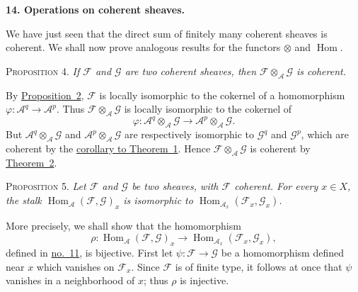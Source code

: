 
\medskip
{}\label{fac:I:2:no:14}
\textbf{14. Operations on coherent sheaves.}

We have just seen that the direct sum of finitely many coherent sheaves is coherent. We shall now prove analogous results for the functors $\otimes$ and $\operatorname{Hom}$.

\label{fac:I:2:no:14:prop:4}
\textsc{Proposition 4.} \textit{If $\mathcal{F}$ and $\mathcal{G}$ are two coherent sheaves, then $\mathcal{F}\otimes_{\mathcal{A}}\mathcal{G}$ is coherent.}

By \hyperref[fac:I:2:no:12:prop:2]{Proposition~2}, $\mathcal{F}$ is locally isomorphic to the cokernel of a homomorphism $\varphi:\mathcal{A}^q\to\mathcal{A}^p$. Thus $\mathcal{F}\otimes_{\mathcal{A}}\mathcal{G}$ is locally isomorphic to the cokernel of
\[
\varphi:\mathcal{A}^q\otimes_{\mathcal{A}}\mathcal{G}
\longrightarrow
\mathcal{A}^p\otimes_{\mathcal{A}}\mathcal{G}.
\]
But $\mathcal{A}^q\otimes_{\mathcal{A}}\mathcal{G}$ and $\mathcal{A}^p\otimes_{\mathcal{A}}\mathcal{G}$ are respectively isomorphic to $\mathcal{G}^q$ and $\mathcal{G}^p$, which are coherent by the \hyperref[fac:I:2:no:13:thm:1:cor]{corollary to Theorem~1}. Hence $\mathcal{F}\otimes_{\mathcal{A}}\mathcal{G}$ is coherent by \hyperref[fac:I:2:no:13:thm:2]{Theorem~2}.

\label{fac:I:2:no:14:prop:5}
\textsc{Proposition 5.} \textit{Let $\mathcal{F}$ and $\mathcal{G}$ be two sheaves, with $\mathcal{F}$ coherent. For every $x\in X$, the stalk $\operatorname{Hom}_{\mathcal{A}}(\mathcal{F},\mathcal{G})_x$ is isomorphic to $\operatorname{Hom}_{\mathcal{A}_x}(\mathcal{F}_x,\mathcal{G}_x)$.}

More precisely, we shall show that the homomorphism
\[
\rho:\operatorname{Hom}_{\mathcal{A}}(\mathcal{F},\mathcal{G})_x
\longrightarrow
\operatorname{Hom}_{\mathcal{A}_x}(\mathcal{F}_x,\mathcal{G}_x),
\]
defined in \hyperref[fac:I:1:no:11]{no.~11}, is bijective. First let $\psi:\mathcal{F}\to\mathcal{G}$ be a homomorphism defined near $x$ which vanishes on $\mathcal{F}_x$. Since $\mathcal{F}$ is of finite type, it follows at once that $\psi$ vanishes in a neighborhood of $x$; thus $\rho$ is injective.


